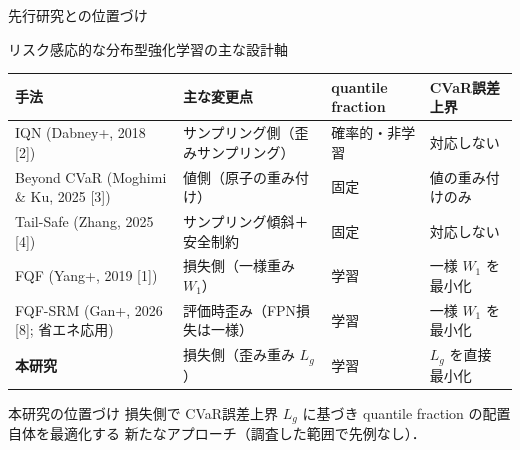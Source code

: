 \documentclass[aspectratio=169, 10pt]{beamer}
\newcommand{\green}[1]{\textcolor{green!40!black}{#1}}
\newcommand{\Lg}{L_g}
\begin{document}
\begin{frame}{先行研究との位置づけ}
  \begin{block}{リスク感応的な分布型強化学習の主な設計軸}
    \centering
    \scriptsize
    \setlength{\tabcolsep}{3pt}
    \begin{tabular}{@{}llll@{}}
      \toprule
      手法 & 主な変更点 & quantile fraction & CVaR誤差上界 \\
      \midrule
      IQN (Dabney+, 2018 [2]) & サンプリング側（歪みサンプリング） & 確率的・非学習 & 対応しない \\
      Beyond CVaR (Moghimi \& Ku, 2025 [3]) & 値側（原子の重み付け） & 固定 & 値の重み付けのみ \\
      Tail-Safe (Zhang, 2025 [4]) & サンプリング傾斜＋安全制約 & 固定 & 対応しない \\
      FQF (Yang+, 2019 [1]) & 損失側（一様重み $W_1$） & \green{学習} & 一様 $W_1$ を最小化 \\
      FQF-SRM (Gan+, 2026 [8]; 省エネ応用) & 評価時歪み（FPN損失は一様） & \green{学習} & 一様 $W_1$ を最小化 \\
      \textbf{本研究} & \alert{損失側（歪み重み $\Lg$）} & \green{学習} & \alert{$\Lg$ を直接最小化} \\
      \bottomrule
    \end{tabular}
  \end{block}
  \begin{exampleblock}{本研究の位置づけ}
    \alert{損失側}で CVaR誤差上界 $\Lg$ に基づき quantile fraction の\alert{配置自体}を最適化する
    新たなアプローチ（調査した範囲で先例なし）．
  \end{exampleblock}
\end{frame}
\end{document}
